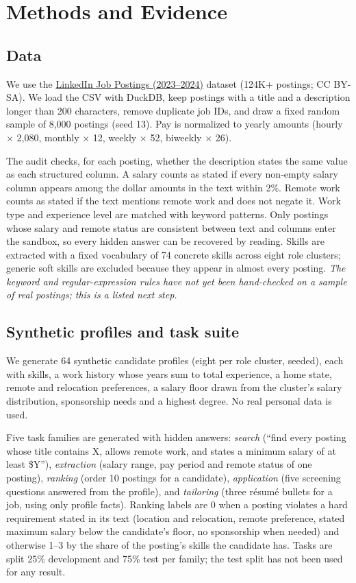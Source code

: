 \documentclass[11pt]{article}
\begin{document}
\section{Methods and Evidence}

\subsection{Data}
We use the \href{https://www.kaggle.com/datasets/arshkon/linkedin-job-postings}{LinkedIn Job Postings (2023--2024)} dataset (124K+ postings; CC BY-SA). We load the CSV with DuckDB, keep postings with a title and a description longer than 200 characters, remove duplicate job IDs, and draw a fixed random sample of 8,000 postings (seed 13). Pay is normalized to yearly amounts (hourly $\times$ 2,080, monthly $\times$ 12, weekly $\times$ 52, biweekly $\times$ 26).

The audit checks, for each posting, whether the description states the same value as each structured column. A salary counts as stated if every non-empty salary column appears among the dollar amounts in the text within 2\%. Remote work counts as stated if the text mentions remote work and does not negate it. Work type and experience level are matched with keyword patterns. Only postings whose salary and remote status are consistent between text and columns enter the sandbox, so every hidden answer can be recovered by reading. Skills are extracted with a fixed vocabulary of 74 concrete skills across eight role clusters; generic soft skills are excluded because they appear in almost every posting. \emph{The keyword and regular-expression rules have not yet been hand-checked on a sample of real postings; this is a listed next step.}

\subsection{Synthetic profiles and task suite}
We generate 64 synthetic candidate profiles (eight per role cluster, seeded), each with skills, a work history whose years sum to total experience, a home state, remote and relocation preferences, a salary floor drawn from the cluster's salary distribution, sponsorship needs and a highest degree. No real personal data is used.

Five task families are generated with hidden answers: \textit{search} (``find every posting whose title contains X, allows remote work, and states a minimum salary of at least \$Y''), \textit{extraction} (salary range, pay period and remote status of one posting), \textit{ranking} (order 10 postings for a candidate), \textit{application} (five screening questions answered from the profile), and \textit{tailoring} (three r\'esum\'e bullets for a job, using only profile facts). Ranking labels are 0 when a posting violates a hard requirement stated in its text (location and relocation, remote preference, stated maximum salary below the candidate's floor, no sponsorship when needed) and otherwise 1--3 by the share of the posting's skills the candidate has. Tasks are split 25\% development and 75\% test per family; the test split has not been used for any result.
\end{document}
